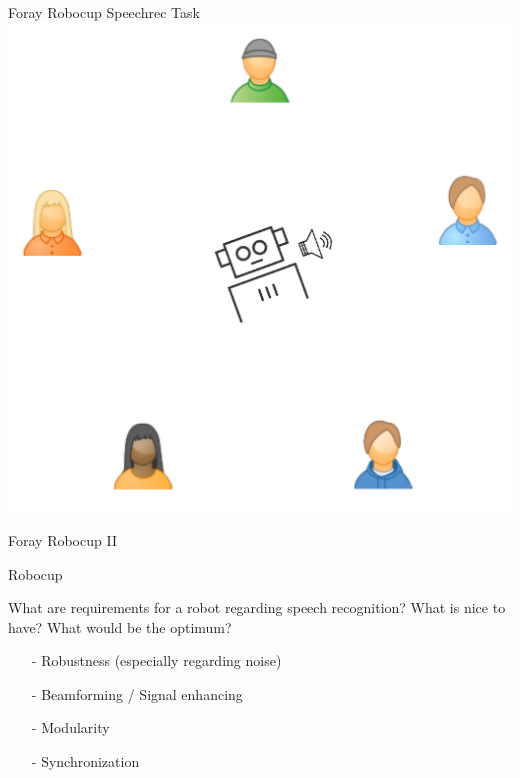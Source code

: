 \documentclass{beamer}
\begin{document}
	\begin{frame}{Foray Robocup Speechrec Task}
		\centering
		\includegraphics[width=.75\textwidth]{Bilder/robocup_task_2}
	\end{frame}
	
	\begin{frame}{Foray Robocup II}
		\centering
	\end{frame}
	
	\begin{frame}{Robocup}
		\begin{alertblock}{What are requirements for a robot regarding speech recognition? What is nice to have? What would be the optimum?}
			\pause
			\begin{itemize}
				\item[-] Robustness (especially regarding noise)
				\item[-] Beamforming / Signal enhancing
				\item[-] Modularity
				\item[-] Synchronization
			\end{itemize}
		\end{alertblock}
	\end{frame}
	
\end{document}
